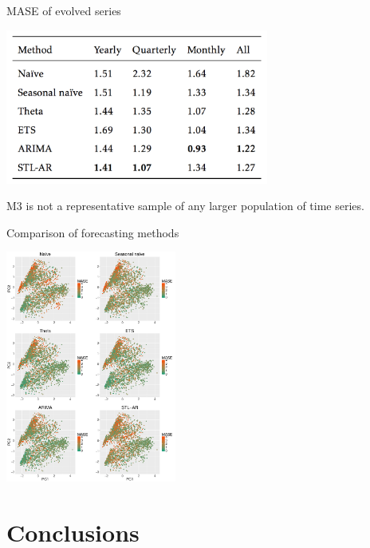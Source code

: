 \documentclass[12pt,ignorenonframetext,compress]{beamer}
\begin{document}
\begin{frame}{MASE of evolved series}

\centerline{\includegraphics[height=2in]{figures/table2.png}}

M3 is not a representative sample of any larger population of time
series.

\end{frame}

\begin{frame}{Comparison of forecasting methods}

\centerline{\includegraphics[height=3in]{figures/MASErainbowPlots.pdf}}

\end{frame}

\section{Conclusions}\label{conclusions}
\end{document}
